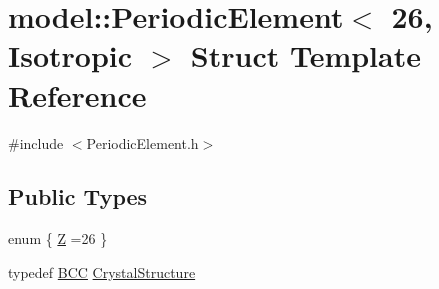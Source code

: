 \hypertarget{structmodel_1_1_periodic_element_3_0126_00_01_isotropic_01_4}{}\section{model\+:\+:Periodic\+Element$<$ 26, Isotropic $>$ Struct Template Reference}
\label{structmodel_1_1_periodic_element_3_0126_00_01_isotropic_01_4}


{\ttfamily \#include $<$Periodic\+Element.\+h$>$}

\subsection*{Public Types}
\begin{DoxyCompactItemize}
\item 
enum \{ \hyperlink{structmodel_1_1_periodic_element_3_0126_00_01_isotropic_01_4_ab94af6d6d1ff024d0f613b3b4d424f42a10ccaa8ea2449c516c02f08e1abd89b7}{Z} =26
 \}
\item 
typedef \hyperlink{structmodel_1_1_b_c_c}{B\+C\+C} \hyperlink{structmodel_1_1_periodic_element_3_0126_00_01_isotropic_01_4_ae6a20675c49555864c79b6aeb6449772}{Crystal\+Structure}
\end{DoxyCompactItemize}
